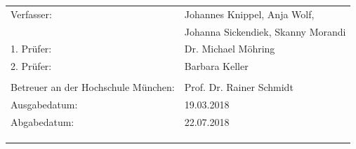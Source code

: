 	
\newpage
\thispagestyle{empty}
\begin{flushleft}	
	\begin{tabular}[H]{ll}
		
		Verfasser: 			& \large{Johannes Knippel, Anja Wolf,}\\[0.2cm]
		 					& \large{Johanna Sickendiek, Skanny Morandi}\\[0,2cm]
		1. Prüfer:		  	& \large{Dr. Michael Möhring}\\[0.2cm]
		2. Prüfer:		 	& \large{Barbara Keller}\\[.7cm]
		\\
		
		
		Betreuer an der Hochschule München: 	& \large{Prof. Dr. Rainer Schmidt}\\[0.5cm]
		Ausgabedatum:					& \large{19.03.2018}\\[0.5cm]
		Abgabedatum:					& \large{22.07.2018}\\[3.5cm]
		\\
		\\
		\\		
	

\end{tabular}
\end{flushleft}
